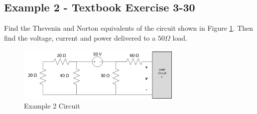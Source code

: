 \documentclass{handout}
\begin{document}
\newpage
\clearpage
\pagebreak


\subsection{Example 2 - Textbook Exercise 3-30}
Find the Thevenin and Norton equivalents of the circuit shown in Figure \ref{fig: Example2}.  Then find the voltage, current and power delivered to a $50 \Omega$ load.
\begin{figure} [h t b]
\centering
\includegraphics[width=0.7\textwidth]{Example2.jpg}
\caption{Example 2 Circuit}
\label{fig: Example2}
\end{figure}
\end{document}
